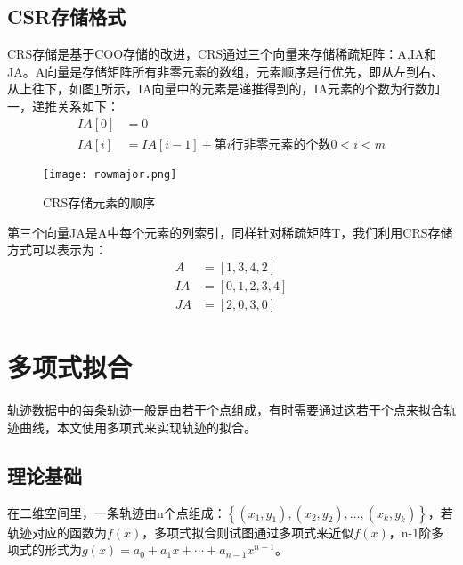 \subsection{CSR存储格式}

CRS存储是基于COO存储的改进，CRS通过三个向量来存储稀疏矩阵：A,IA和JA。A向量是存储矩阵所有非零元素的数组，元素顺序是行优先，即从左到右、从上往下，如图\ref{rowmajor}所示，IA向量中的元素是递推得到的，IA元素的个数为行数加一，递推关系如下：
\[
\begin{aligned}
IA\left[ 0 \right] &=0
\\
IA\left[ i \right] &=IA\left[ i-1 \right] +第i\text{行非零元素的个数} 0<i<m
\end{aligned}
\]
\begin{figure}[h]
	\texttt{[image: rowmajor.png]}
	\caption{CRS存储元素的顺序}
	\label{rowmajor}
\end{figure}

第三个向量JA是A中每个元素的列索引，同样针对稀疏矩阵T，我们利用CRS存储方式可以表示为：
\[
\begin{aligned}
A&=\left[ 1,3,4,2 \right] 
\\
IA&=\left[ 0,1,2,3,4 \right] 
\\
JA&=\left[ 2,0,3,0 \right] 
\end{aligned}
\]


\section{多项式拟合}
轨迹数据中的每条轨迹一般是由若干个点组成，有时需要通过这若干个点来拟合轨迹曲线，本文使用多项式来实现轨迹的拟合。
\subsection{理论基础}
在二维空间里，一条轨迹由n个点组成：$\left\{\left(x_{1}, y_{1}\right),\left(x_{2}, y_{2}\right), \dots,\left(x_{k}, y_{k}\right)\right\}$，若轨迹对应的函数为$f(x)$，多项式拟合则试图通过多项式来近似$f(x)$，n-1阶多项式的形式为$g\left( x \right) =a_0+a_1x+\cdots +a_{n-1}x^{n-1}$。

